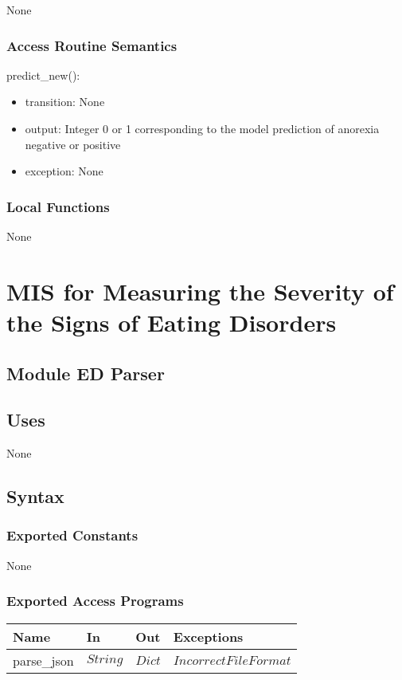 \documentclass[12pt, titlepage]{article}
\begin{document}
None

\subsubsection{Access Routine Semantics}

\noindent predict\_new():
\begin{itemize}
\item transition: None
\item output: Integer 0 or 1 corresponding to the model prediction of anorexia negative or positive 
\item exception: None
\end{itemize}

\subsubsection{Local Functions}

None

\newpage

\section{MIS for Measuring the Severity of the Signs of Eating Disorders} \label{Module}

\subsection{Module ED Parser}

\subsection{Uses}

None

\subsection{Syntax}

\subsubsection{Exported Constants}

None

\subsubsection{Exported Access Programs}

\begin{center}
\begin{tabular}{p{2cm} p{3cm} p{3cm} p{4cm}}
\hline
\textbf{Name} & \textbf{In} & \textbf{Out} & \textbf{Exceptions} \\
\hline
parse\_json & $String$ & $Dict$ & $IncorrectFileFormat$ \\
\hline
\end{tabular}
\end{center}
\end{document}
